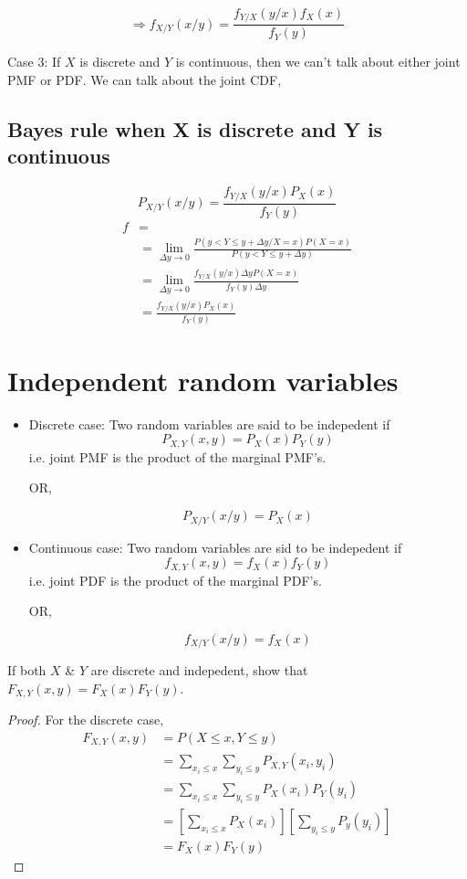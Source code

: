 \documentclass{article}
\begin{document}
$$ \Rightarrow f_{X/Y}(x/y)  =\frac{f_{Y/X} (y/x)  f_X (x) }{f_Y (y)}$$


Case 3: If $X$ is discrete and $Y$ is continuous, then we can't talk about either joint PMF or PDF. We can talk about the joint CDF,
\subsection{Bayes rule when X is discrete and Y is continuous}
$$ P_{X/Y} (x/y) = \frac{f_{Y/X} (y/x) P_X (x)}{f_Y(y)}$$
\begin{align*}
    f &= \\
    &= \lim_{\Delta y \to 0} \frac{P(y< Y \leq y + \Delta y / X= x)P(X=x)}{P(y<Y \leq y+ \Delta y)} \\
    &= \lim_{\Delta y \to 0}\frac{f_{Y/X} (y/x) \Delta y P(X=x)}{f_Y(y) \Delta y} \\
    &=\frac{f_{Y/X} (y/x) P_X (x)}{f_Y(y)}
\end{align*}

\section{Independent random variables}

\begin{itemize}
    \item Discrete case: Two random variables are said to be indepedent if
    $$ P_{X,Y}(x,y)= P_X (x) P_Y(y)$$
    i.e. joint PMF is the product of the marginal PMF's.

    OR,

    $$ P_{X/Y}(x/y) = P_X (x)$$
    \item Continuous case: Two random variables are sid to be indepedent if
    $$ f_{X,Y}(x,y)= f_X (x) f_Y (y)$$
    i.e. joint PDF is the product of the marginal PDF's.

    OR,

    $$ f_{X/Y}(x/y) = f_X (x)$$
\end{itemize}

If both $X$ \& $Y$ are discrete and indepedent, show that $F_{X,Y}(x,y)= F_X (x) F_Y (y)$.
\begin{proof}
    For the discrete case,
    \begin{align*}
        F_{X,Y}(x,y)&= P(X \leq x, Y \leq y) \\
        &= \sum_{x_i \leq x} \sum_{y_i \leq y} P_{X,Y}(x_i,y_i) \\
        &= \sum_{x_i \leq x} \sum_{y_i \leq y} P_{X}(x_i) P_Y(y_i) \\
        &= \left[ \sum_{x_i \leq x} P_{X}(x_i)\right] \left[ \sum_{y_i \leq y} P_{y}(y_i)\right] \\
        &= F_X (x) F_Y (y)
    \end{align*}
\end{proof}
\end{document}
